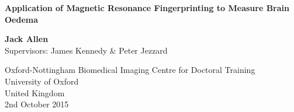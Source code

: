 \begin{titlepage}
    \begin{center}
        \vspace*{5cm}
        
        \textbf{ Application of Magnetic Resonance Fingerprinting to Measure Brain Oedema}
        
      
        
        \vspace{1.5cm}
        
        \textbf{Jack Allen}
         \\
Supervisors: James Kennedy \& Peter Jezzard
        \vfill
        
       
        
        \vspace{0.8cm}
        

        
        Oxford-Nottingham Biomedical Imaging Centre for Doctoral Training\\
        University of Oxford\\
        United Kingdom\\
        2nd October 2015
        
    \end{center}
\end{titlepage}
